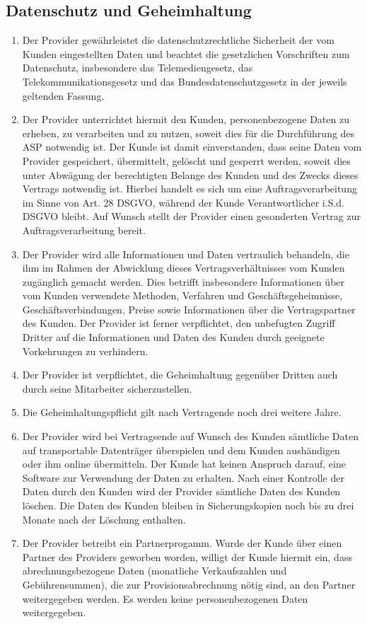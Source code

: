 \documentclass{terms}
\begin{document}
\subsection{Datenschutz und Geheimhaltung}
\begin{enumerate}
\item Der Provider gewährleistet die datenschutzrechtliche Sicherheit der vom Kunden eingestellten Daten und beachtet die gesetzlichen Vorschriften zum Datenschutz, insbesondere das Telemediengesetz, das Telekommunikationsgesetz und das Bundesdatenschutzgesetz in der jeweils geltenden Fassung.
\item Der Provider unterrichtet hiermit den Kunden, personenbezogene Daten zu erheben, zu verarbeiten und zu nutzen, soweit dies für die Durchführung des ASP notwendig ist. Der Kunde ist damit einverstanden, dass seine Daten vom Provider gespeichert, übermittelt, gelöscht und gesperrt werden, soweit dies unter Abwägung der berechtigten Belange des Kunden und des Zwecks dieses Vertrags notwendig ist. Hierbei handelt es sich um eine Auftragsverarbeitung im Sinne von Art. 28 DSGVO, während der Kunde Verantwortlicher i.S.d. DSGVO bleibt. Auf Wunsch stellt der Provider einen gesonderten Vertrag zur Auftragsverarbeitung bereit.
\item Der Provider wird alle Informationen und Daten vertraulich behandeln, die ihm im Rahmen der Abwicklung dieses Vertragsverhältnisses vom Kunden zugänglich gemacht werden. Dies betrifft insbesondere Informationen über vom Kunden verwendete Methoden, Verfahren und Geschäftsgeheimnisse, Geschäftsverbindungen, Preise sowie Informationen über die Vertragspartner des Kunden. Der Provider ist ferner verpflichtet, den unbefugten Zugriff Dritter auf die Informationen und Daten des Kunden durch geeignete Vorkehrungen zu verhindern.
\item Der Provider ist verpflichtet, die Geheimhaltung gegenüber Dritten auch durch seine Mitarbeiter sicherzustellen.
\item Die Geheimhaltungspflicht gilt nach Vertragende noch drei weitere Jahre. 
\item Der Provider wird bei Vertragsende auf Wunsch des Kunden sämtliche Daten auf transportable Datenträger überspielen und dem Kunden aushändigen oder ihm online übermitteln. Der Kunde hat keinen Anspruch darauf, eine Software zur Verwendung der Daten zu erhalten. Nach einer Kontrolle der Daten durch den Kunden wird der Provider sämtliche Daten des Kunden löschen. Die Daten des Kunden bleiben in Sicherungskopien noch bis zu drei Monate nach der Löschung enthalten.
\item Der Provider betreibt ein Partnerprogamm. Wurde der Kunde über einen Partner des Providers geworben worden, willigt der Kunde hiermit ein, dass abrechnungsbezogene Daten (monatliche Verkaufszahlen und Gebührensummen), die zur Provisionsabrechnung nötig sind, an den Partner weitergegeben werden. Es werden keine personenbezogenen Daten weitergegeben.
\end{enumerate}
\end{document}
